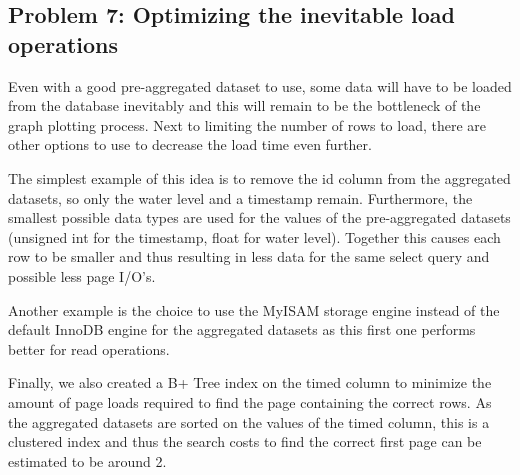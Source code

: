 \subsection{Problem 7: Optimizing the inevitable load operations}
Even with a good pre-aggregated dataset to use, some data will have to be loaded from the database inevitably and this will remain to be the bottleneck of the graph plotting process. Next to limiting the number of rows to load, there are other options to use to decrease the load time even further. 

The simplest example of this idea is to remove the id column from the aggregated datasets, so only the water level and a timestamp remain. Furthermore, the smallest possible data types are used for the values of the pre-aggregated datasets (unsigned int for the timestamp, float for water level). Together this causes each row to be smaller and thus resulting in less data for the same select query and possible less page I/O's.

Another example is the choice to use the MyISAM storage engine instead of the default InnoDB engine for the aggregated datasets as this first one performs better for read operations.

Finally, we also created a B+ Tree index on the timed column to minimize the amount of page loads required to find the page containing the correct rows. As the aggregated datasets are sorted on the values of the timed column, this is a clustered index and thus the search costs to find the correct first page can be estimated to be around 2. 
